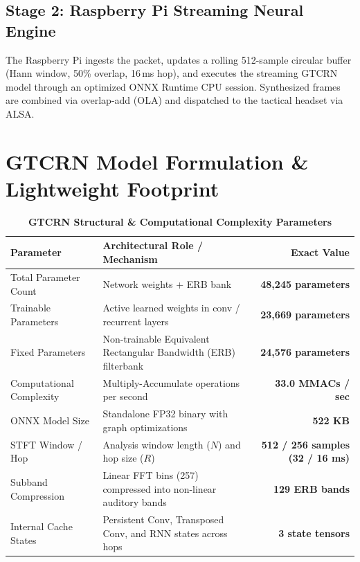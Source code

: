 \documentclass[11pt,a4paper]{article}
\begin{document}
\subsection{Stage 2: Raspberry Pi Streaming Neural Engine}
The Raspberry Pi ingests the packet, updates a rolling 512-sample circular buffer (Hann window, 50\% overlap, 16\,ms hop), and executes the streaming GTCRN model through an optimized ONNX Runtime CPU session. Synthesized frames are combined via overlap-add (OLA) and dispatched to the tactical headset via ALSA.

\section{GTCRN Model Formulation \& Lightweight Footprint}

\begin{table}[t]
\centering
\small
\caption{\textbf{GTCRN Structural \& Computational Complexity Parameters}}
\vspace{4pt}
\begin{tabularx}{\textwidth}{l X r}
\toprule
\textbf{Parameter} & \textbf{Architectural Role / Mechanism} & \textbf{Exact Value} \\
\midrule
Total Parameter Count & Network weights + ERB bank & \textbf{48,245 parameters} \\
Trainable Parameters & Active learned weights in conv / recurrent layers & \textbf{23,669 parameters} \\
Fixed Parameters & Non-trainable Equivalent Rectangular Bandwidth (ERB) filterbank & \textbf{24,576 parameters} \\
Computational Complexity & Multiply-Accumulate operations per second & \textbf{33.0 MMACs / sec} \\
ONNX Model Size & Standalone FP32 binary with graph optimizations & \textbf{522 KB} \\
STFT Window / Hop & Analysis window length ($N$) and hop size ($R$) & \textbf{512 / 256 samples (32 / 16 ms)} \\
Subband Compression & Linear FFT bins (257) compressed into non-linear auditory bands & \textbf{129 ERB bands} \\
Internal Cache States & Persistent Conv, Transposed Conv, and RNN states across hops & \textbf{3 state tensors} \\
\bottomrule
\end{tabularx}
\label{tab:gtcrn_specs}
\end{table}
\end{document}
